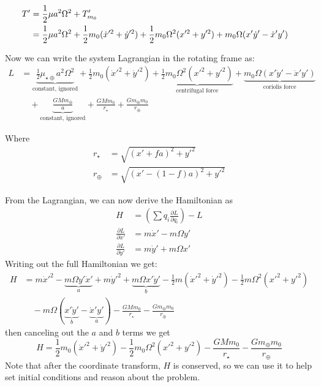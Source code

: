 \documentclass[11pt]{article}
\begin{document}
\begin{align}
    \hspace{-5cm}T' &= \frac{1}{2}\mu a^2\Omega^2 + T'_{m_{0}} \\
    &= \frac{1}{2}\mu a^2\Omega^2 + \frac{1}{2}m_0(\dot x'^2 +\dot y'^2) + \frac{1}{2}m_0\Omega^2(x'^2 + y'^2) + m_0\Omega(x'\dot y' - \dot x' y')
\end{align}

Now we can write the system Lagrangian in the rotating frame as:
\begin{align}
    L &= \underbrace{\frac{1}{2}\mu_{\star\oplus}a^2\Omega^2}_\text{constant, ignored} + \frac{1}{2}m_0(\dot x'^2 +\dot y'^2) + \underbrace{\frac{1}{2}m_0\Omega^2(x'^2 + y'^2)}_\text{centrifugal force} + \underbrace{m_0\Omega(x'\dot y' - \dot x' y')}_\text{coriolis force} \nonumber \\
    & \quad + \underbrace{\frac{GMm_\oplus}{a}}_\text{constant, ignored} + \frac{GMm_0}{r_\star} + \frac{Gm_\oplus m_0}{r_\oplus}
\end{align}

Where
\begin{align}
    r_\star &= \sqrt{(x'+fa)^2 + y'^2} \\
    r_\oplus &= \sqrt{(x'-(1-f)a)^2 + y'^2}
\end{align}

From the Lagrangian, we can now derive the Hamiltonian as
\begin{align}
    H &= (\sum q_i\frac{\partial L}{\partial q_i}) - L \\ 
    \frac{\partial L}{\partial \dot x'} &= m\dot x' -m\Omega y' \\
    \frac{\partial L}{\partial \dot y'} &= m\dot y' + m\Omega x' 
\end{align}
Writing out the full Hamiltonian we get:
\begin{align}
    H &= m\dot x'^2 - \underbrace{m\Omega y'\dot x'}_a + m\dot y'^2 + \underbrace{m\Omega x'\dot y'}_b - \frac{1}{2}m(\dot x'^2 + \dot y'^2) - \frac{1}{2} m\Omega^2(x'^2 + y'^2) \nonumber \\
    & \quad - m\Omega(\underbrace{x'\dot y'}_b - \underbrace{\dot x' y'}_a) - \frac{GMm_{0}}{r_\star} - \frac{Gm_\oplus m_{0}}{r_\oplus}
\end{align}
then canceling out the $a$ and $b$ terms we get
\begin{equation}
    H = \frac{1}{2}m_{0}(\dot x'^2 + \dot y'^2) - \frac{1}{2} m_{0}\Omega^2(x'^2 + y'^2)  - \frac{GMm_{0}}{r_\star} - \frac{Gm_\oplus m_{0}}{r_\oplus}
\end{equation}
Note that after the coordinate transform, $H$ is conserved, so we can use it to help set initial conditions and reason about the problem. %
\end{document}
